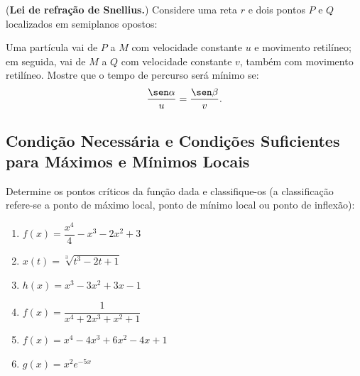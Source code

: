 \begin{exercicio}[33]
(\textbf{Lei de refração de Snellius.}) Considere uma reta $r$ e dois pontos $P$ e $Q$ localizados em semiplanos opostos:

\begin{center}
\end{center}

Uma partícula vai de $P$ a $M$ com velocidade constante $u$ e movimento retilíneo; em seguida, vai de $M$ a $Q$ com velocidade constante $v$, também com movimento retilíneo. Mostre que o tempo de percurso será mínimo se:
\[
\dfrac{\sen\alpha}{u} = \dfrac{\sen\beta}{v}.
\]
\end{exercicio}

\clearpage

\subsection{Condição Necessária e Condições Suficientes para Máximos e Mínimos Locais}

\begin{exercicio}[1]
Determine os pontos críticos da função dada e classifique-os (a classificação refere-se a ponto de máximo local, ponto de mínimo local ou ponto de inflexão):
\begin{enumerate}[label=\alph*)]
    \item $f(x) = \dfrac{x^4}{4} - x^3 - 2x^2 + 3$
    \item $x(t) = \sqrt[3]{t^3 - 2t + 1}$
    \item $h(x) = x^3 - 3x^2 + 3x - 1$
    \item $f(x) = \dfrac{1}{x^4 + 2x^3 + x^2 + 1}$
    \item $f(x) = x^4 - 4x^3 + 6x^2 - 4x + 1$
    \item $g(x) = x^2 e^{-5x}$
\end{enumerate}
\end{exercicio}

